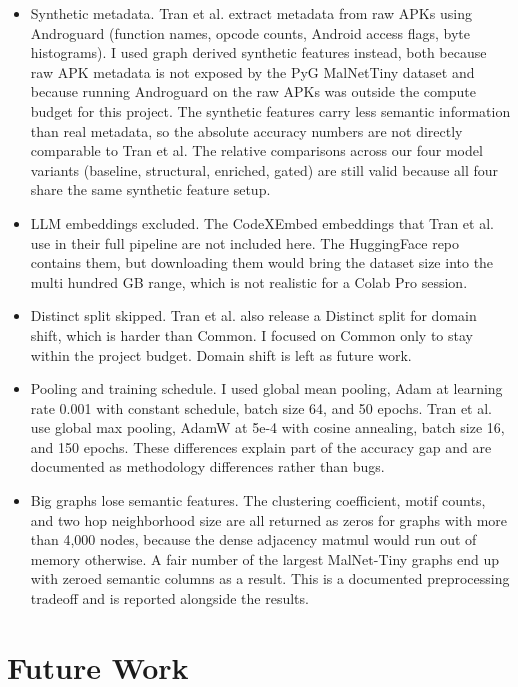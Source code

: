 \documentclass[12pt]{article}
\begin{document}
\begin{itemize}
    \item Synthetic metadata. Tran et al. \cite{tran2025} extract metadata from raw APKs using Androguard (function names, opcode counts, Android access flags, byte histograms). I used graph derived synthetic features instead, both because raw APK metadata is not exposed by the PyG MalNetTiny dataset and because running Androguard on the raw APKs was outside the compute budget for this project. The synthetic features carry less semantic information than real metadata, so the absolute accuracy numbers are not directly comparable to Tran et al. The relative comparisons across our four model variants (baseline, structural, enriched, gated) are still valid because all four share the same synthetic feature setup.
    \item LLM embeddings excluded. The CodeXEmbed embeddings that Tran et al. use in their full pipeline are not included here. The HuggingFace repo contains them, but downloading them would bring the dataset size into the multi hundred GB range, which is not realistic for a Colab Pro session.
    \item Distinct split skipped. Tran et al. also release a Distinct split for domain shift, which is harder than Common. I focused on Common only to stay within the project budget. Domain shift is left as future work.
    \item Pooling and training schedule. I used global mean pooling, Adam at learning rate 0.001 with constant schedule, batch size 64, and 50 epochs. Tran et al. use global max pooling, AdamW at 5e-4 with cosine annealing, batch size 16, and 150 epochs. These differences explain part of the accuracy gap and are documented as methodology differences rather than bugs.
    \item Big graphs lose semantic features. The clustering coefficient, motif counts, and two hop neighborhood size are all returned as zeros for graphs with more than 4,000 nodes, because the dense adjacency matmul would run out of memory otherwise. A fair number of the largest MalNet-Tiny graphs end up with zeroed semantic columns as a result. This is a documented preprocessing tradeoff and is reported alongside the results.
\end{itemize}

\section{Future Work}
\end{document}
